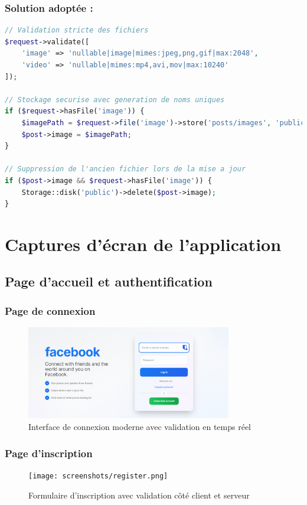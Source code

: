 \documentclass[12pt,a4paper]{article}
\begin{document}
\subsubsection{Solution adopt\'ee :}
\begin{lstlisting}[language=PHP]
// Validation stricte des fichiers
$request->validate([
    'image' => 'nullable|image|mimes:jpeg,png,gif|max:2048',
    'video' => 'nullable|mimes:mp4,avi,mov|max:10240'
]);

// Stockage securise avec generation de noms uniques
if ($request->hasFile('image')) {
    $imagePath = $request->file('image')->store('posts/images', 'public');
    $post->image = $imagePath;
}

// Suppression de l'ancien fichier lors de la mise a jour
if ($post->image && $request->hasFile('image')) {
    Storage::disk('public')->delete($post->image);
}
\end{lstlisting}

\section{Captures d'\'ecran de l'application}

\subsection{Page d'accueil et authentification}

\subsubsection{Page de connexion}
\begin{figure}[H]
    \centering
    \includegraphics[width=0.8\textwidth]{screenshots/login.png}
    \caption{Interface de connexion moderne avec validation en temps r\'eel}
    \label{fig:login}
\end{figure}

\subsubsection{Page d'inscription}
\begin{figure}[H]
    \centering
    \texttt{[image: screenshots/register.png]}
    \caption{Formulaire d'inscription avec validation c\^ot\'e client et serveur}
    \label{fig:register}
\end{figure}
\end{document}
